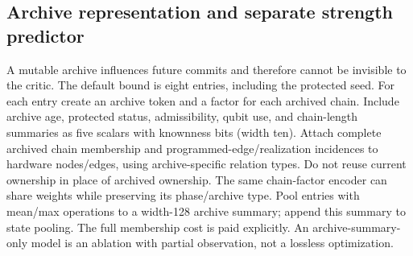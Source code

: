 \subsection{Archive representation and separate strength predictor}

A mutable archive influences future commits and therefore cannot be invisible to the critic. The default bound is eight entries, including the protected seed. For each entry create an archive token and a factor for each archived chain. Include archive age, protected status, admissibility, qubit use, and chain-length summaries as five scalars with knownness bits (width ten). Attach complete archived chain membership and programmed-edge/realization incidences to hardware nodes/edges, using archive-specific relation types. Do not reuse current ownership in place of archived ownership. The same chain-factor encoder can share weights while preserving its phase/archive type. Pool entries with mean/max operations to a width-128 archive summary; append this summary to state pooling. The full membership cost is paid explicitly. An archive-summary-only model is an ablation with partial observation, not a lossless optimization.


